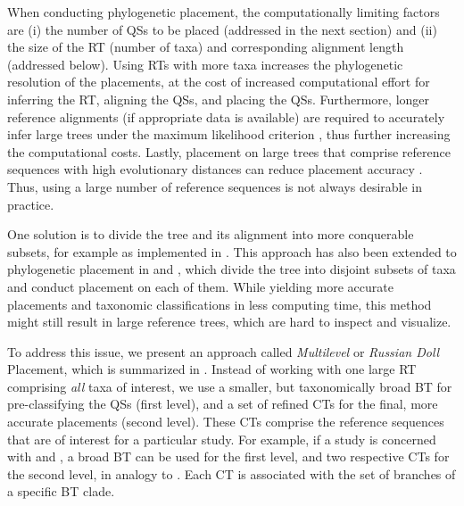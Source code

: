 When conducting phylogenetic placement, the computationally limiting factors are
(i) the number of \acp{QS} to be placed (addressed in the next section) and
(ii) the size of the \ac{RT} (number of taxa) and corresponding alignment length (addressed below).
Using \acp{RT} with more taxa increases the phylogenetic resolution of the placements,
at the cost of increased computational effort for inferring the \ac{RT}, aligning the \acp{QS}, and placing the \acp{QS}.
Furthermore, longer reference alignments (if appropriate data is available)
are required to accurately infer large trees under the maximum likelihood criterion \citep{Yang1994},
thus further increasing the computational costs.
Lastly, placement on large trees that comprise reference sequences with high evolutionary distances
can reduce placement accuracy \citep{Mirarab2012}.
Thus, using a large number of reference sequences is not always desirable in practice.

One solution is to divide the tree and its alignment into more conquerable subsets, %
for example as implemented in  \citep{Liu2009,Liu2012}.
This approach has also been extended to phylogenetic placement
in  \citep{Mirarab2012} and  \citep{Nguyen2014},
which divide the tree into disjoint subsets of taxa and conduct placement on each of them.
While yielding more accurate placements and taxonomic classifications in less computing time,
this method might still result in large reference trees, which are hard to inspect and visualize.

To address this issue, we present an approach called \emph{Multilevel} or \emph{Russian Doll} Placement,
which is summarized in .
Instead of working with one large \ac{RT} comprising {\em all} taxa of interest,
we use a smaller, but taxonomically broad \ac{BT} for pre-classifying the \acp{QS} (first level),
and a set of refined \acp{CT} for the final, more accurate placements (second level).
These \acp{CT} comprise the reference sequences that are of interest for a particular study.
For example, if a study is concerned with  and ,
a broad  \ac{BT} can be used for the first level,
and two respective \acp{CT} for the second level, in analogy to \citep{Mahe2017}.
Each \ac{CT} is associated with the set of branches of a specific \ac{BT} clade.

